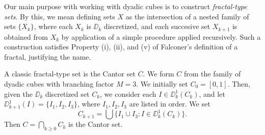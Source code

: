 Our main purpose with working with dyadic cubes is to construct \emph{fractal-type sets}. By this, we mean defining sets $X$ as the intersection of a nested family of sets $\{ X_k \}$, where each $X_k$ is $\DD_k$ discretized, and each succesive set $X_{k+1}$ is obtained from $X_k$ by application of a simple procedure applied recursively. Such a construction satisfies Property (i), (ii), and (v) of Falconer's definition of a fractal, justifying the name.

\begin{example}
	A classic fractal-type set is the Cantor set $C$. We form $C$ from the family of dyadic cubes with branching factor $M = 3$. We initially set $C_0 = [0,1]$. Then, given the $\DD_k$ discretized set $C_k$, we consider each $I \in \DD_k^1(C_k)$, and let $\DD_{k+1}^1(I) = \{ I_1, I_2, I_3 \}$, where $I_1, I_2, I_3$ are listed in order. We set
	\[ C_{k+1} = \bigcup \{ I_1 \cup I_3 : I \in \DD_k^1(C_k) \}. \]
	Then $C = \bigcap_{k \geq 0} C_k$ is the Cantor set.
\end{example}

